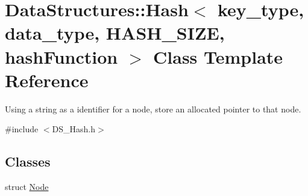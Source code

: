 \hypertarget{class_data_structures_1_1_hash}{\section{Data\-Structures\-:\-:Hash$<$ key\-\_\-type, data\-\_\-type, H\-A\-S\-H\-\_\-\-S\-I\-Z\-E, hash\-Function $>$ Class Template Reference}
\label{class_data_structures_1_1_hash}
}


Using a string as a identifier for a node, store an allocated pointer to that node.  




{\ttfamily \#include $<$D\-S\-\_\-\-Hash.\-h$>$}

\subsection*{Classes}
\begin{DoxyCompactItemize}
\item 
struct \hyperlink{struct_data_structures_1_1_hash_1_1_node}{Node}
\end{DoxyCompactItemize}
